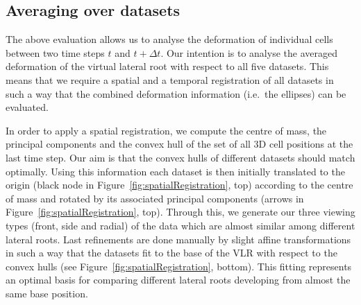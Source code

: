 \documentclass[11pt,a4paper, draft]{article}
\begin{document}
\subsection{Averaging over datasets}
\noindent
The above evaluation allows us to analyse the deformation of individual cells between two time steps $t$ and $t + \Delta t$. Our intention is to analyse the averaged deformation of the virtual lateral root with respect to all five datasets. This means that we require a spatial and a temporal registration of all datasets in such a way that the combined deformation information (i.e.~the ellipses) can be evaluated.

In order to apply a spatial registration, we compute the centre of mass, the principal components and the convex hull of the set of all 3D cell positions at the last time step. Our aim is that the convex hulls of different datasets should match optimally. Using this information each dataset is then initially translated to the origin (black node in Figure~\ref{fig:spatialRegistration}, top) according to the centre of mass and rotated by its associated principal components (arrows in Figure~\ref{fig:spatialRegistration}, top). Through this, we generate our three viewing types (front, side and radial) of the data which are almost similar among different lateral roots. Last refinements are done manually by slight affine transformations in such a way that the datasets fit to the base of the VLR with respect to the convex hulls (see Figure~\ref{fig:spatialRegistration}, bottom). This fitting represents an optimal basis for comparing different lateral roots developing from almost the same base position.
\end{document}
